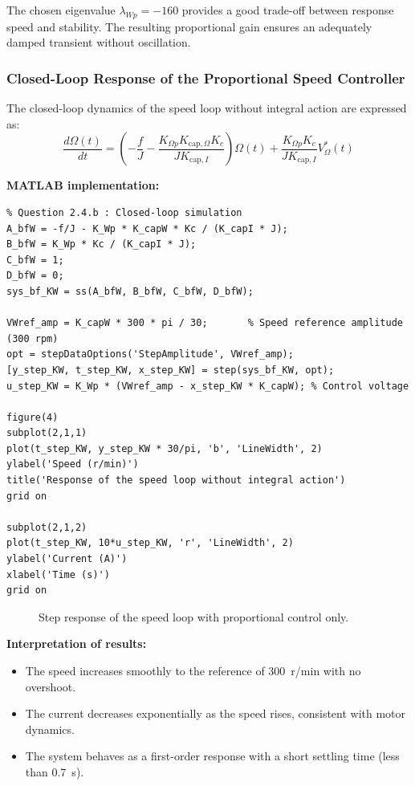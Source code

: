 \documentclass{rapportCS}
\begin{document}
The chosen eigenvalue $\lambda_{Wp} = -160$ provides a good trade-off between response speed and stability.  
The resulting proportional gain ensures an adequately damped transient without oscillation.
\subsubsection{Closed-Loop Response of the Proportional Speed Controller}

The closed-loop dynamics of the speed loop without integral action are expressed as:
\begin{equation*}
\frac{d\Omega(t)}{dt} =
\left(-\frac{f}{J} - \frac{K_{\Omega p}K_{\mathrm{cap},\Omega}K_c}{J K_{\mathrm{cap},I}}\right)\Omega(t)
+ \frac{K_{\Omega p} K_c}{J K_{\mathrm{cap},I}} V_{\Omega}^*(t)
\end{equation*}

\noindent\textbf{MATLAB implementation:}
\begin{verbatim}
% Question 2.4.b : Closed-loop simulation
A_bfW = -f/J - K_Wp * K_capW * Kc / (K_capI * J);
B_bfW = K_Wp * Kc / (K_capI * J);
C_bfW = 1;
D_bfW = 0;
sys_bf_KW = ss(A_bfW, B_bfW, C_bfW, D_bfW);

VWref_amp = K_capW * 300 * pi / 30;       % Speed reference amplitude (300 rpm)
opt = stepDataOptions('StepAmplitude', VWref_amp);
[y_step_KW, t_step_KW, x_step_KW] = step(sys_bf_KW, opt);
u_step_KW = K_Wp * (VWref_amp - x_step_KW * K_capW); % Control voltage

figure(4)
subplot(2,1,1)
plot(t_step_KW, y_step_KW * 30/pi, 'b', 'LineWidth', 2)
ylabel('Speed (r/min)')
title('Response of the speed loop without integral action')
grid on

subplot(2,1,2)
plot(t_step_KW, 10*u_step_KW, 'r', 'LineWidth', 2)
ylabel('Current (A)')
xlabel('Time (s)')
grid on
\end{verbatim}

\begin{figure}[H]
    \centering
    \caption{Step response of the speed loop with proportional control only.}
    \label{fig:speedloop_no_integral}
\end{figure}

\noindent\textbf{Interpretation of results:}
\begin{itemize}
    \item The speed increases smoothly to the reference of 300~r/min with no overshoot.
    \item The current decreases exponentially as the speed rises, consistent with motor dynamics.
    \item The system behaves as a first-order response with a short settling time (less than 0.7~s).
\end{itemize}
\end{document}
